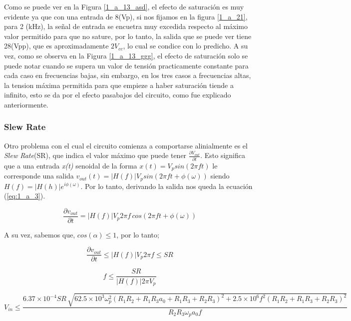 Como se puede ver en la Figura \ref{1_a_13_asd}, el efecto de saturación
es muy evidente ya que con una entrada de 8(Vp), si nos fijamos en
la figura \ref{1_a_21}, para 2 (kHz), la señal de entrada se encuetra
muy excedida respecto al máximo valor permitido para que no sature,
por lo tanto, la salida que se puede ver tiene 28(Vpp), que es aproximadamente
$2V_{cc}$, lo cual se condice con lo predicho. A su vez, como se
observa en la Figura \ref{1_a_13_ggg}, el efecto de saturación solo
se puede notar cuando se supera un valor de tensión practicamente
constante para cada caso en frecuencias bajas, sin embargo, en los
tres casos a frecuencias altas, la tension máxima permitida para que
empieze a haber saturación tiende a infinito, esto se da por el efecto
pasabajos del circuito, como fue explicado anteriormente.

\subsubsection{Slew Rate}

Otro problema con el cual el circuito comienza a comportarse alinialmente
es el \emph{Slew Rate}(SR), que indica el valor máximo que puede tener
$\frac{\partial V_{out}}{\partial t}$. Esto significa que a una entrada
\emph{x(t) }senoidal de la forma $x(t)=V_{p}sin(2\pi ft)$ le corresponde
una salida $v_{out}(t)=\left|H(f)\right|V_{p}sin(2\pi ft+\phi(\omega))$
siendo $H(f)=\left|H(h)\right|e^{i\phi(\omega)}$. Por lo tanto, derivando
la salida nos queda la ecuación (\ref{eq:1_a_3}).

\begin{equation}
\frac{\partial v_{out}}{\partial t}=\left|H(f)\right|V_{p}2\pi f\,cos\left(2\pi ft+\phi(\omega)\right)\label{eq:1_a_3}
\end{equation}

A su vez, sabemos que, $cos(\alpha)\leq1$, por lo tanto;

\[
\frac{\partial v_{out}}{\partial t}\leq\left|H(f)\right|V_{p}2\pi f\leq SR
\]

\begin{equation}
f\leq\frac{SR}{\left|H(f)\right|2\pi V_{p}}\label{eq:1_a_4}
\end{equation}

\[
V_{in}\leq\frac{6.37\times10^{-4}SR\,\sqrt{62.5\times10^{3}\omega_{p}^{2}\left(R_{1}R_{2}+R_{1}R_{3}a_{0}+R_{1}R_{3}+R_{2}R_{3}\right)^{2}+2.5\times10^{6}f^{2}\left(R_{1}R_{2}+R_{1}R_{3}+R_{2}R_{3}\right)^{2}}}{R_{2}R_{3}\omega_{p}a_{0}f}
\]

